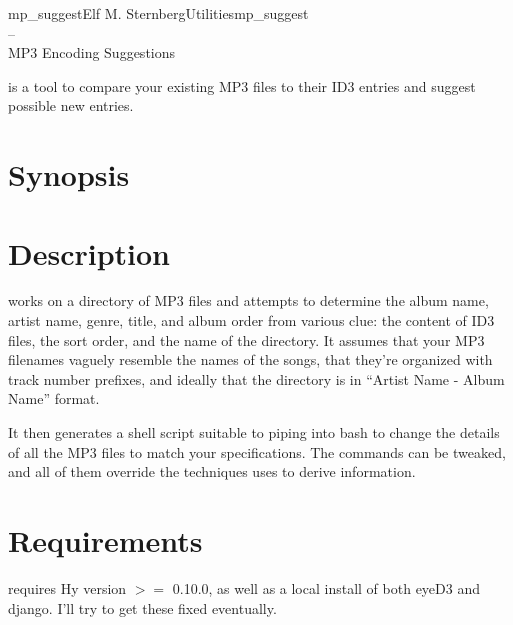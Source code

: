 \documentclass[english]{article}
\begin{document}
\begin{Name}{1}{mp\_suggest}{Elf M. Sternberg}{Utilities}{mp\_suggest \\--\\ MP3 Encoding Suggestions}

   is a tool to compare your existing MP3 files to
  their ID3 entries and suggest possible new entries.

\end{Name}

\section{Synopsis}

 

\section{Description}

 works on a directory of MP3 files and attempts to
determine the album name, artist name, genre, title, and album order
from various clue: the content of ID3 files, the sort order, and the
name of the directory.  It assumes that your MP3 filenames vaguely
resemble the names of the songs, that they're organized with track
number prefixes, and ideally that the directory is in ``Artist Name -
Album Name'' format.

It then generates a shell script suitable to piping into bash to change
the details of all the MP3 files to match your specifications.  The
commands can be tweaked, and all of them override the techniques
 uses to derive information.

\section{Requirements}

\begin{description}\setlength{\itemsep}{1cm}
\item[Hy]  requires Hy version $>=$ 0.10.0, as well as
  a local install of both eyeD3 and django.  I'll try to get these
  fixed eventually.

\end{description}
\end{document}
